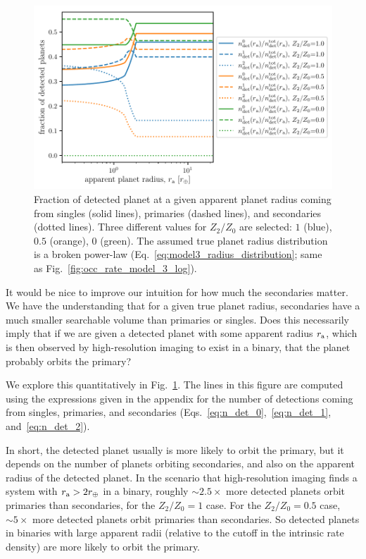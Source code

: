 \documentclass[12pt,modern]{aastex61}
\renewcommand{\a}{_{\rm a}}
\begin{document}
\begin{figure}[!t]
    \centering
    \includegraphics[width=\textwidth]{figures/ndet_vs_radius_logx_model_3_fraclines_rpu_22.5_manyZs.pdf}
    \caption{
        Fraction of detected planet at a given apparent planet radius coming 
        from singles (solid lines), primaries (dashed lines), and secondaries 
        (dotted lines).
        Three different values for $Z_2/Z_0$ are selected: $1$ (blue), $0.5$ 
        (orange), $0$ (green).
        The assumed true planet radius distribution is a broken power-law
        (Eq.~\ref{eq:model3_radius_distribution}; same as 
        Fig.~\ref{fig:occ_rate_model_3_log}).
    }
    \label{fig:frac_model_3}
\end{figure}

It would be nice to improve our intuition for how much the secondaries matter.
We have the understanding that for a given true planet radius, secondaries 
have a much smaller searchable volume than primaries or singles.
Does this necessarily imply that if we are given a detected planet with some 
apparent radius $r\a$, which is then observed by high-resolution imaging to 
exist in a binary, that the planet probably orbits the primary?

We explore this quantitatively in Fig.~\ref{fig:frac_model_3}.
The lines in this figure are computed using the expressions given in the 
appendix for the number of detections coming from singles, primaries, and 
secondaries (Eqs.~\ref{eq:n_det_0},~\ref{eq:n_det_1}, and~\ref{eq:n_det_2}).

In short, the detected planet usually is more likely to orbit the primary, but 
it depends on the number of planets orbiting secondaries, and also on the 
apparent radius of the detected planet.
In the scenario that high-resolution imaging finds a system with $r\a > 
2r_\oplus$ in a binary, roughly $\sim\! 2.5\times$ more detected planets orbit 
primaries than secondaries, for the $Z_2/Z_0=1$ case.
For the $Z_2/Z_0=0.5$ case, $\sim\! 5\times$ more detected 
planets orbit primaries than secondaries.
So detected planets in binaries with large apparent radii (relative to the 
cutoff in the intrinsic rate density) are more likely to orbit the primary.
\end{document}
